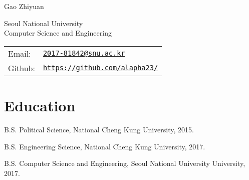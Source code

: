 \documentclass[letterpaper]{article}
\def\name{Gao Zhiyuan}
\renewenvironment{itemize}{
  \begin{list}{}{
    \setlength{\leftmargin}{1.5em}
  }
}{
  \end{list}
}
\begin{document}
{\huge \name}


\vspace{0.25in}

\begin{minipage}{0.45\linewidth}
  Seoul National University \\
  Computer Science and Engineering \\
\end{minipage}
\begin{minipage}{0.45\linewidth}
  \begin{tabular}{ll}
    Email: & \href{mailto:2017-81842@snu.ac.kr}{\tt 2017-81842@snu.ac.kr} \\
    Github: & \href{https://github.com/alapha23/}{\tt https://github.com/alapha23/} \\
  \end{tabular}
\end{minipage}


%


\section*{Education}

\begin{itemize}
  \item B.S. Political Science, National Cheng Kung University, 2015.

  \item B.S. Engineering Science, National Cheng Kung University, 2017.

  \item B.S. Computer Science and Engineering, Seoul National University University, 2017.
\end{itemize}
\end{document}

